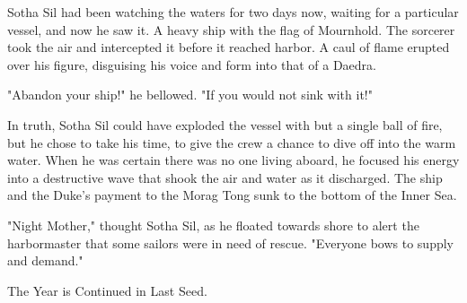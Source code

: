 Sotha Sil had been watching the waters for two days now, waiting for a particular vessel, and now he saw it. A heavy ship with the flag of Mournhold. The sorcerer took the air and intercepted it before it reached harbor. A caul of flame erupted over his figure, disguising his voice and form into that of a Daedra.

"Abandon your ship!" he bellowed. "If you would not sink with it!"

In truth, Sotha Sil could have exploded the vessel with but a single ball of fire, but he chose to take his time, to give the crew a chance to dive off into the warm water. When he was certain there was no one living aboard, he focused his energy into a destructive wave that shook the air and water as it discharged. The ship and the Duke's payment to the Morag Tong sunk to the bottom of the Inner Sea.

"Night Mother," thought Sotha Sil, as he floated towards shore to alert the harbormaster that some sailors were in need of rescue. "Everyone bows to supply and demand."

The Year is Continued in Last Seed.